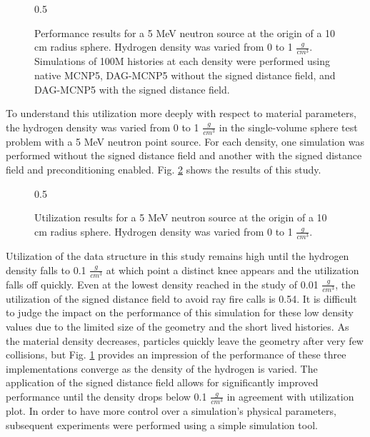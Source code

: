 \begin{figure}[ht]
  \centering
  {0.5\textwidth}
  \caption{Performance results for a 5 MeV neutron source at the origin of a 10
    cm radius sphere. Hydrogen density was varied from 0 to 1
    $\frac{g}{cm^3}$. Simulations of 100M histories at each density were
    performed using native MCNP5, DAG-MCNP5 without the signed distance field,
    and DAG-MCNP5 with the signed distance field.}
  \label{fig:sphere_hydrogen_density_study_perf}
\end{figure}

To understand this utilization more deeply with respect to material parameters,
the hydrogen density was varied from 0 to 1 $\frac{g}{cm^3}$ in the single-volume
sphere test problem with a 5 MeV neutron point source. For each density, one
simulation was performed without the signed distance field and another with the
signed distance field and preconditioning enabled. Fig.
\ref{fig:sphere_hydrogen_density_study_util} shows the results of this study. 

\begin{figure}[ht]
  \centering
  {0.5\textwidth}
  \caption{Utilization results for a 5 MeV neutron source at the origin of a 10 cm radius
    sphere. Hydrogen density was varied from 0 to 1 $\frac{g}{cm^3}$.}
  \label{fig:sphere_hydrogen_density_study_util}
\end{figure}

Utilization of the data structure in this study remains high until the hydrogen
density falls to 0.1 $\frac{g}{cm^3}$ at which point a distinct knee appears and
the utilization falls off quickly. Even at the lowest density reached in the
study of 0.01 $\frac{g}{cm^3}$, the utilization of the signed distance field to
avoid ray fire calls is 0.54.  It is difficult to judge the impact on the
performance of this simulation for these low density values due to the limited
size of the geometry and the short lived histories. As the material density
decreases, particles quickly leave the geometry after very few collisions, but
Fig. \ref{fig:sphere_hydrogen_density_study_perf} provides an impression of the
performance of these three implementations converge as the density of the
hydrogen is varied. The application of the signed distance field allows for
significantly improved performance until the density drops below 0.1
$\frac{g}{cm^3}$ in agreement with utilization plot. In order to have more
control over a simulation's physical parameters, subsequent experiments were
performed using a simple simulation tool.

